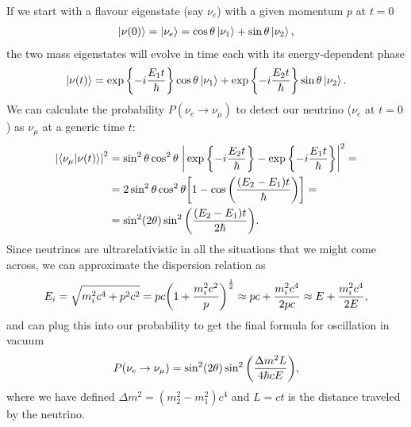 If we start with a flavour eigenstate (say $\nu_e$) with a given momentum $p$ at $t=0$
\begin{align*}
  \ket{\nu(0)} = \ket{\nu_e} = \cos\theta \ket{\nu_1} + \sin\theta \ket{\nu_2},
\end{align*}
the two mass eigenstates will evolve in time each with its energy-dependent phase
\begin{align*}
  \ket{\nu(t)} =
    \exp\qty{-i\frac{E_1t}{\hbar}} \cos\theta \ket{\nu_1} +
    \exp\qty{-i\frac{E_2t}{\hbar}} \sin\theta \ket{\nu_2}.
\end{align*}
We can calculate the probability $P(\nu_e \rightarrow \nu_\mu)$ to detect our
neutrino ($\nu_e$ at $t = 0$) as $\nu_\mu$ at a generic time $t$:
\begin{align*}
  \abs{\braket{\nu_\mu}{\nu(t)}}^2 & = \sin^2\theta \cos^2\theta \;
    \abs{\,\exp\qty{-i\frac{E_2t}{\hbar}} - \exp\qty{-i\frac{E_1t}{\hbar}}}^2 = \\
  & = 2 \sin^2\theta \cos^2\theta \qty[1 - \cos\qty(\frac{(E_2 - E_1)t}{\hbar})] = \\
  & = \sin^2(2\theta)\sin^2 \qty(\frac{(E_2 - E_1)t}{2 \hbar}).
\end{align*}
Since neutrinos are ultrarelativistic in all the situations that we might come
across, we can approximate the dispersion relation as
\begin{align*}
  E_i = \sqrt{m_i^2 c^4 + p^2 c^2} =
  pc \qty(1 + \frac{m_i^2 c^2}{p})^\frac{1}{2} \approx
  pc + \frac{m_i^2 c^4}{2pc} \approx E + \frac{m_i^2 c^4}{2E},
\end{align*}
and can plug this into our probability to get the final formula for oscillation
in vacuum
\begin{align}\label{eq:nu_two_flavor_osc_prob}
  P(\nu_e \rightarrow \nu_\mu) =
  \sin^2(2\theta)\sin^2 \qty(\frac{\Delta m^2 L}{4 \hbar c E}),
\end{align}
where we have defined
$\Delta m^2 = (m_2^2 - m_1^2) c^4$ and $L = ct$ is the distance traveled by the
neutrino.

